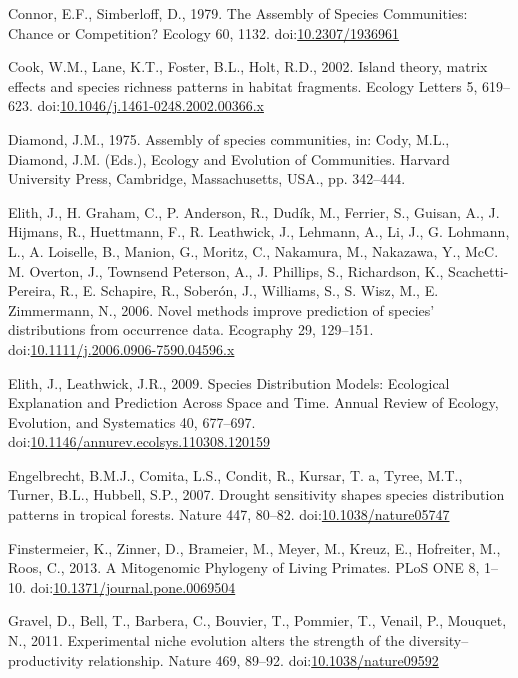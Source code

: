 \hypertarget{ref-Connor1979}{}
Connor, E.F., Simberloff, D., 1979. The Assembly of Species Communities:
Chance or Competition? Ecology 60, 1132.
doi:\href{https://doi.org/10.2307/1936961}{10.2307/1936961}

\hypertarget{ref-Cook2002}{}
Cook, W.M., Lane, K.T., Foster, B.L., Holt, R.D., 2002. Island theory,
matrix effects and species richness patterns in habitat fragments.
Ecology Letters 5, 619--623.
doi:\href{https://doi.org/10.1046/j.1461-0248.2002.00366.x}{10.1046/j.1461-0248.2002.00366.x}

\hypertarget{ref-Diamond1975}{}
Diamond, J.M., 1975. Assembly of species communities, in: Cody, M.L.,
Diamond, J.M. (Eds.), Ecology and Evolution of Communities. Harvard
University Press, Cambridge, Massachusetts, USA., pp. 342--444.

\hypertarget{ref-Elith2006}{}
Elith, J., H. Graham, C., P. Anderson, R., Dudík, M., Ferrier, S.,
Guisan, A., J. Hijmans, R., Huettmann, F., R. Leathwick, J., Lehmann,
A., Li, J., G. Lohmann, L., A. Loiselle, B., Manion, G., Moritz, C.,
Nakamura, M., Nakazawa, Y., McC. M. Overton, J., Townsend Peterson, A.,
J. Phillips, S., Richardson, K., Scachetti-Pereira, R., E. Schapire, R.,
Soberón, J., Williams, S., S. Wisz, M., E. Zimmermann, N., 2006. Novel
methods improve prediction of species' distributions from occurrence
data. Ecography 29, 129--151.
doi:\href{https://doi.org/10.1111/j.2006.0906-7590.04596.x}{10.1111/j.2006.0906-7590.04596.x}

\hypertarget{ref-Elith2009a}{}
Elith, J., Leathwick, J.R., 2009. Species Distribution Models:
Ecological Explanation and Prediction Across Space and Time. Annual
Review of Ecology, Evolution, and Systematics 40, 677--697.
doi:\href{https://doi.org/10.1146/annurev.ecolsys.110308.120159}{10.1146/annurev.ecolsys.110308.120159}

\hypertarget{ref-Engelbrecht2007}{}
Engelbrecht, B.M.J., Comita, L.S., Condit, R., Kursar, T. a, Tyree,
M.T., Turner, B.L., Hubbell, S.P., 2007. Drought sensitivity shapes
species distribution patterns in tropical forests. Nature 447, 80--82.
doi:\href{https://doi.org/10.1038/nature05747}{10.1038/nature05747}

\hypertarget{ref-Finstermeier2013}{}
Finstermeier, K., Zinner, D., Brameier, M., Meyer, M., Kreuz, E.,
Hofreiter, M., Roos, C., 2013. A Mitogenomic Phylogeny of Living
Primates. PLoS ONE 8, 1--10.
doi:\href{https://doi.org/10.1371/journal.pone.0069504}{10.1371/journal.pone.0069504}

\hypertarget{ref-Gravel2011c}{}
Gravel, D., Bell, T., Barbera, C., Bouvier, T., Pommier, T., Venail, P.,
Mouquet, N., 2011. Experimental niche evolution alters the strength of
the diversity--productivity relationship. Nature 469, 89--92.
doi:\href{https://doi.org/10.1038/nature09592}{10.1038/nature09592}

